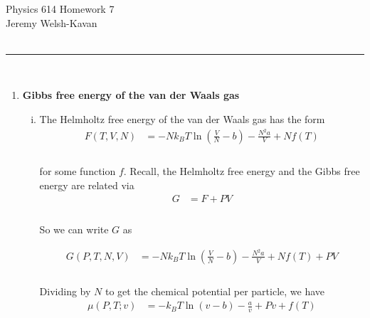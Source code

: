 \documentclass[]{article}
\begin{document}
{\Large Physics 614 Homework 7}\\
{Jeremy Welsh-Kavan}\\
\hfill \\
\noindent\rule{15cm}{0.4pt} \\


\begin{enumerate}[1.]


\item {\bf Gibbs free energy of the van der Waals gas} \\


\begin{enumerate}[i.]
 
\item The Helmholtz free energy of the van der Waals gas has the form \\

\begin{equation}
\begin{aligned}
F(T,V,N) & = - N k_B T \ln(  \frac{V}{N} - b ) - \frac{ N^2 a }{V} + N f(T) \\
\end{aligned}
\end{equation} \\

for some function $f$. Recall, the Helmholtz free energy and the Gibbs free energy are related via \\


\begin{equation}
\begin{aligned}
G & = F + PV \\
\end{aligned}
\end{equation} \\

So we can write $G$ as

\begin{equation}
\begin{aligned}
G(P,T,N,V) & = - N k_B T \ln(  \frac{V}{N} - b ) - \frac{ N^2 a }{V} + N f(T)  + PV \\
\end{aligned}
\end{equation} \\

Dividing by $N$ to get the chemical potential per particle, we have \\

\begin{equation}
\begin{aligned}
\mu (P, T ; v)  & = -  k_B T \ln( v - b ) - \frac{ a }{v}  + Pv  +  f(T)  \\
\end{aligned}
\end{equation} \\
 

\end{enumerate}
\end{enumerate}
\end{document}
